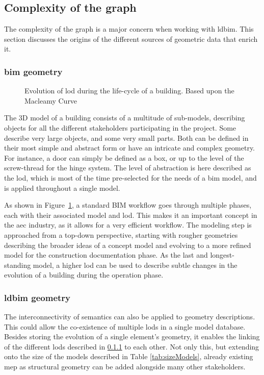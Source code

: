\subsection{Complexity of the graph}
The complexity of the graph is a major concern when working with \ac{ldbim}. This section discusses the origins of the different sources of geometric data that enrich it.

\subsubsection{\ac{bim} geometry} \label{subsec:bimGeometry}
\begin{figure}[h]
	\centering
	
	\vspace{-0.3cm}
	\caption{Evolution of \acs{lod} during the life-cycle of a building. Based upon the Macleamy Curve \parencite{Ilozor2012}}
	\label{fig:bimGraph}
\end{figure}

The 3D model of a building consists of a multitude of sub-models, describing objects for all the different stakeholders participating in the project. Some describe very large objects, and some very small parts. Both can be defined in their most simple and abstract form or have an intricate and complex geometry. For instance, a door can simply be defined as a box, or up to the level of the screw-thread for the hinge system. The level of abstraction is here described as the \ac{lod}, which is most of the time pre-selected for the needs of a \ac{bim} model, and is applied throughout a single model.

As shown in Figure~\ref{fig:bimGraph}, a standard BIM workflow goes through multiple phases, each with their associated model and \ac{lod}. This makes it an important concept in the \ac{aec} industry, as it allows for a very efficient workflow. The modeling step is approached from a top-down perspective, starting with rougher geometries describing the broader ideas of a concept model and evolving to a more refined model for the construction documentation phase. As the last and longest-standing model, a higher \ac{lod} can be used to describe subtle changes in the evolution of a building during the operation phase.

\subsubsection{\acs{ldbim} geometry}
The interconnectivity of semantics can also be applied to geometry descriptions. This could allow the co-existence of multiple \ac{lod}s in a single model database. Besides storing the evolution of a single element's geometry, it enables the linking of the different \ac{lod}s described in \ref{subsec:bimGeometry} to each other. Not only this, but extending onto the size of the models described in Table \ref{tab:sizeModels}, already existing \ac{mep} as structural geometry can be added alongside many other stakeholders.

